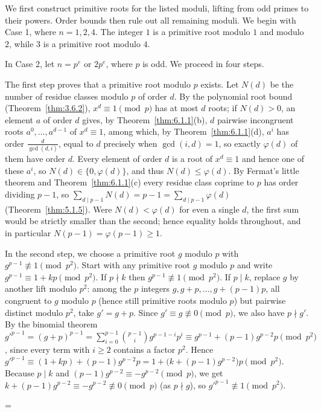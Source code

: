 \documentclass[11pt]{article}
\makeatletter
\theoremstyle{ntstyle}
\let\nt@closedisplay\]
\def\nt@guardedclose{\@ifnextchar\par{\nt@closeafterpar}{\@ifnextchar\end{\postdisplaypenalty\@M\nt@closedisplay}{\nt@closedisplay}}}
\def\nt@closeafterpar\par{\@ifnextchar\par{\nt@closeafterpar}{\@ifnextchar\end{\postdisplaypenalty\@M\nt@closedisplay\par}{\nt@closedisplay\par}}}
\renewenvironment{proof}[1][\proofname]{\par
  \pushQED{\qed}\normalfont\topsep\medskipamount\edef\nt@afterproof{\@endparpenalty=\the\@endparpenalty\relax}\@beginparpenalty\@M\@endparpenalty\@M\let\]\nt@guardedclose\trivlist\item[]\textit{#1\@addpunct{.}} \ignorespaces}{\ifvmode\addpenalty\@M\fi\popQED\nt@afterproof\endtrivlist\@endpefalse}
\makeatother
\begin{document}
\begin{proof} We first construct primitive roots for the listed moduli, lifting from odd
	primes to their powers. Order bounds then rule out all remaining moduli.
	We begin with Case 1, where $n = 1, 2, 4$. The integer $1$ is a primitive root
	modulo $1$ and modulo $2$, while $3$ is a primitive root modulo $4$.

	In Case 2, let $n = p^{e}$ or $2p^{e}$, where $p$ is odd. We proceed in four steps.

	The first step proves that a primitive root modulo $p$ exists. Let $N(d)$ be the number
	of residue classes modulo $p$ of order $d$. By the polynomial root bound
	(Theorem~\ref{thm:3.6.2}), $x^d\equiv1\pmod{p}$ has at most $d$ roots; if $N(d) > 0$, an element
	$a$ of
	order $d$ gives, by Theorem~\ref{thm:6.1.1}(b), $d$ pairwise incongruent roots $a^{0}, \ldots, a^{d-1}$ of $x^{d}
		\equiv 1$, among which, by Theorem~\ref{thm:6.1.1}(d), $a^{i}$ has order
	$\frac{d}{\gcd(d, i)}$, equal to $d$ precisely when $\gcd(i, d) = 1$,
	so exactly $\varphi(d)$ of them have order $d$. Every element of
	order $d$ is a root of $x^{d} \equiv 1$ and hence one of these
	$a^{i}$, so $N(d) \in \{0, \varphi(d)\}$, and thus $N(d) \le
		\varphi(d)$. By Fermat's little theorem and Theorem~\ref{thm:6.1.1}(c) every
	residue class coprime to $p$ has order dividing $p-1$, so $\sum_{d
			\mid p-1} N(d) = p - 1 = \sum_{d \mid p-1}\varphi(d)$ (Theorem~\ref{thm:5.1.5}). Were $N(d) <
			\varphi(d)$ for even a single $d$, the first
	sum would be strictly smaller than the second; hence equality holds
	throughout, and in particular $N(p-1) = \varphi(p-1) \ge 1$.

	In the second step, we choose a primitive root $g$ modulo $p$ with $g^{p-1} \not\equiv 1
		\pmod{p^2}$. Start with any primitive root $g$ modulo $p$ and write
	$g^{p-1} \equiv 1 + kp \pmod{p^2}$. If $p \nmid k$ then $g^{p-1}
		\not\equiv 1 \pmod{p^2}$. If $p \mid k$, replace $g$ by another lift
	modulo $p^2$: among the $p$ integers $g, g+p, \ldots, g+(p-1)p$, all
	congruent to $g$ modulo $p$ (hence still primitive roots modulo $p$)
	but pairwise distinct modulo $p^2$, take $g' = g + p$. Since $g' \equiv g \not\equiv 0 \pmod{p}$, we
	also have $p \nmid g'$. By the binomial theorem
	$g'^{p-1} = (g+p)^{p-1} = \sum_{i=0}^{p-1}
		\binom{p-1}{i} g^{p-1-i} p^{i} \equiv g^{p-1} + (p-1) g^{p-2} p
		\pmod{p^2}$, since every term with $i \ge 2$ contains a factor
	$p^{2}$. Hence $g'^{p-1} \equiv (1 + kp) + (p-1) g^{p-2} p = 1 +
		\big(k + (p-1) g^{p-2}\big) p \pmod{p^2}$. Because $p \mid k$ and
	$(p-1) g^{p-2} \equiv -g^{p-2} \pmod{p}$, we get $k + (p-1) g^{p-2}
		\equiv -g^{p-2} \not\equiv 0 \pmod{p}$ (as $p \nmid g$), so $g'^{p-1}
		\not\equiv 1 \pmod{p^2}$.


\end{proof}
\end{document}
